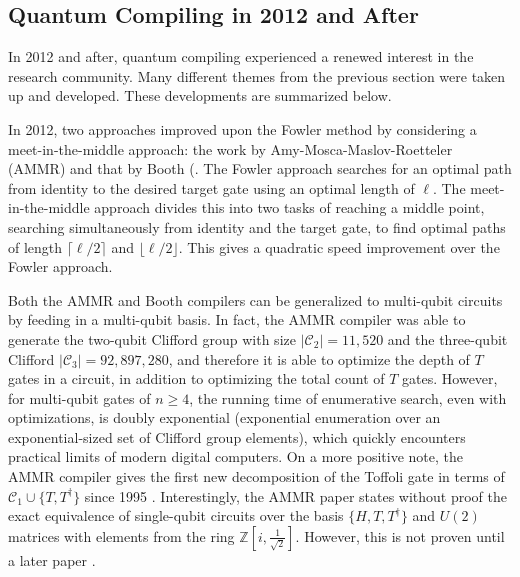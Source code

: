 \subsection{Quantum Compiling in 2012 and After}
\label{subsec:qcompile-post2012}

In 2012 and after, quantum compiling experienced a renewed interest in the
research community. Many different themes from the previous section were
taken up and developed. These developments are summarized below.

In 2012, two approaches improved upon the Fowler method by considering a
meet-in-the-middle approach: the work by Amy-Mosca-Maslov-Roetteler (AMMR)
\cite{Amy2012} and that by Booth (\cite{Booth2012}.
The Fowler approach searches for an
optimal path from identity to the desired target gate using an optimal
length of $\ell$. The meet-in-the-middle approach divides this into two tasks of
reaching a middle point, searching simultaneously from identity and the
target gate, to find optimal paths of length $\lceil \ell/2 \rceil$
and $\lfloor \ell/2 \rfloor$. This gives a quadratic speed improvement over
the Fowler approach.

Both the AMMR and Booth compilers can be generalized to
multi-qubit circuits by feeding in a multi-qubit basis. In fact, the AMMR compiler
was able to generate the two-qubit Clifford group with
size $|\mathcal{C}_2| = 11,520$ and the three-qubit Clifford
$|\mathcal{C}_3| = 92,897,280$, and therefore it is able to optimize
the depth of $T$ gates in a circuit, in addition to optimizing the total
count of $T$ gates. However, for multi-qubit gates of $n \ge 4$,
the running time of enumerative search, even with optimizations, is
doubly exponential (exponential enumeration over an exponential-sized
set of Clifford group elements), which quickly encounters practical limits
of modern digital computers.
On a more positive note, the AMMR compiler gives the first new decomposition
of the Toffoli gate in terms of $\mathcal{C}_1 \cup \{T, T^{\dagger}\}$
since 1995 \cite{Barenco1995a}. Interestingly, the AMMR paper states without
proof the
exact equivalence of single-qubit circuits over the basis
$\{H, T, T^{\dagger}\}$ and $U(2)$ matrices with elements from the ring $\mathbb{Z}\left[i,\frac{1}{\sqrt{2}}\right]$.
However, this is not proven until a later paper \cite{Kliuchnikov2013}.

